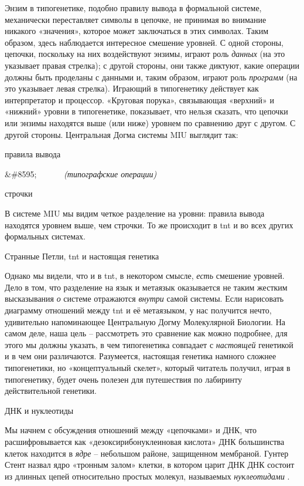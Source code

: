 \documentclass[../main.tex]{subfiles}
\begin{document}
Энзим в типогенетике, подобно правилу вывода в формальной системе, механически переставляет символы в цепочке, не принимая во внимание никакого «значения», которое может заключаться в этих символах. Таким образом, здесь наблюдается интересное смешение уровней. С одной стороны, цепочки, поскольку на них воздействуют энзимы, играют роль \emph{данных} (на это указывает правая стрелка); с другой стороны, они также диктуют, какие операции должны быть проделаны с данными и, таким образом, играют роль \emph{программ} (на это указывает левая стрелка). Играющий в типогенетику действует как интерпретатор и процессор. «Круговая порука», связывающая «верхний» и «нижний» уровни в типогенетике, показывает, что нельзя сказать, что цепочки или энзимы находятся выше (или ниже) уровнем по сравнению друг с другом. С другой стороны. Центральная Догма системы MIU выглядит так:

правила вывода

\&\#8595;~~~~~~ \emph{(типографские операции)}

строчки

В системе MIU мы видим четкое разделение на уровни: правила вывода находятся уровнем выше, чем строчки. То же происходит в \acs{tnt} и во всех других формальных системах.

Странные Петли, \acs{tnt} и настоящая генетика

Однако мы видели, что и в \acs{tnt}, в некотором смысле, \emph{есть} смешение уровней. Дело в том, что разделение на язык и метаязык оказывается не таким жестким высказывания \emph{о} системе отражаются \emph{внутри} самой системы. Если нарисовать диаграмму отношений между \acs{tnt} и её метаязыком, у нас получится нечто, удивительно напоминающее Центральную Догму Молекулярной Биологии. На самом деле, наша цель \--- рассмотреть это сравнение как можно подробнее, для этого мы должны указать, в чем типогенетика совпадает с \emph{настоящей} генетикой и в чем они различаются. Разумеется, настоящая генетика намного сложнее типогенетики, но «концептуальный скелет», который читатель получил, играя в типогенетику, будет очень полезен для путешествия по лабиринту действительной генетики.

ДНК и нуклеотиды

Мы начнем с обсуждения отношений между «цепочками» и ДНК, что расшифровывается как «дезоксирибонуклеиновая кислота» ДНК большинства клеток находится в \emph{ядре} \--- небольшом районе, защищенном мембраной. Гунтер Стент назвал ядро «тронным залом» клетки, в котором царит ДНК ДНК состоит из длинных цепей относительно простых молекул, называемых \emph{нуклеотидами} .
\end{document}
